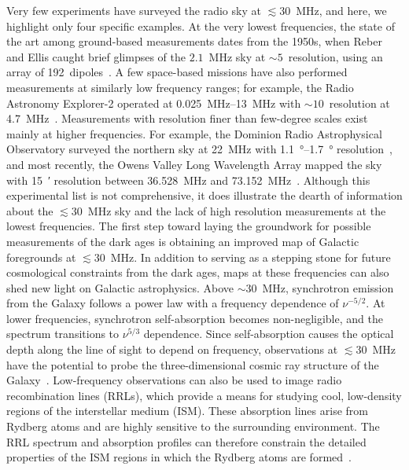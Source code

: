 \documentclass{ws-jai}
\begin{document}
Very few experiments have surveyed the radio sky at $\lesssim 30$~MHz,
and here, we highlight only four specific examples.  At the very
lowest frequencies, the state of the art among ground-based
measurements dates from the 1950s, when Reber and Ellis caught brief
glimpses of the $2.1$~MHz sky at $\sim 5$\degree\ resolution, using an
array of 192~dipoles~\citep{1956JGR....61....1R}.  A few space-based
missions have also performed measurements at similarly low frequency
ranges; for example, the Radio Astronomy Explorer-2 operated at
\SIrange{0.025}{13}{\MHz} with $\sim 10$\degree\ resolution at
\SI{4.7}{\MHz}~\citep{1975A&A....40..365A}.  Measurements with
resolution finer than few-degree scales exist mainly at higher
frequencies.  For example, the Dominion Radio Astrophysical
Observatory surveyed the northern sky at \SI{22}{\MHz} with
\SIrange{1.1}{1.7}{\degree} resolution~\citep{1999A&AS..137....7R},
and most recently, the Owens Valley Long Wavelength Array mapped the
sky with \SI{15}{\arcminute} resolution between 36.528~MHz and
73.152~MHz~\citep{2018AJ....156...32E}.  Although this experimental
list is not comprehensive, it does illustrate the dearth of
information about the $\lesssim 30$~MHz sky and the lack of high
resolution measurements at the lowest frequencies.  The first step
toward laying the groundwork for possible measurements of the dark
ages is obtaining an improved map of Galactic foregrounds at $\lesssim
30$~MHz.  In addition to serving as a stepping stone for future
cosmological constraints from the dark ages, maps at these frequencies
can also shed new light on Galactic astrophysics.  Above $\sim30$~MHz,
synchrotron emission from the Galaxy follows a power law with a
frequency dependence of $\nu^{-5/2}$.  At lower frequencies,
synchrotron self-absorption becomes non-negligible, and the spectrum
transitions to $\nu^{5/3}$ dependence.  Since self-absorption causes
the optical depth along the line of sight to depend on frequency,
observations at $\lesssim 30$~MHz have the potential to probe the
three-dimensional cosmic ray structure of the
Galaxy~\citep{2002ApJ...575..217P}.  Low-frequency observations can
also be used to image radio recombination lines (RRLs), which provide
a means for studying cool, low-density regions of the interstellar
medium (ISM).  These absorption lines arise from Rydberg atoms and are
highly sensitive to the surrounding environment.  The RRL spectrum and
absorption profiles can therefore constrain the detailed properties of
the ISM regions in which the Rydberg atoms are
formed~\citep{2009NewAR..53..259G, 2007MNRAS.374..852S}.
\end{document}
